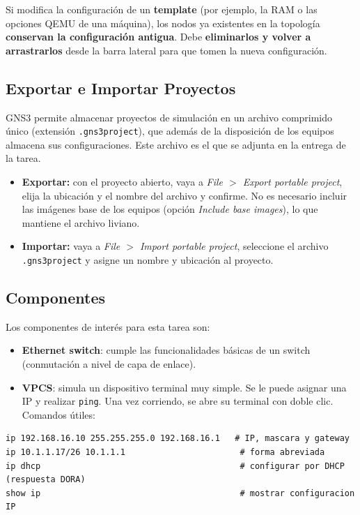\documentclass[letterpaper,12pt]{article}
\begin{document}
\begin{nota}
Si modifica la configuración de un \textbf{template} (por ejemplo, la RAM o las opciones QEMU de una máquina), los nodos ya existentes en la topología \textbf{conservan la configuración antigua}. Debe \textbf{eliminarlos y volver a arrastrarlos} desde la barra lateral para que tomen la nueva configuración.
\end{nota}

\subsection{Exportar e Importar Proyectos}

GNS3 permite almacenar proyectos de simulación en un archivo comprimido único (extensión \texttt{.gns3project}), que además de la disposición de los equipos almacena sus configuraciones. Este archivo es el que se adjunta en la entrega de la tarea.

\begin{itemize}
    \item \textbf{Exportar:} con el proyecto abierto, vaya a \textit{File $>$ Export portable project}, elija la ubicación y el nombre del archivo y confirme. No es necesario incluir las imágenes base de los equipos (opción \textit{Include base images}), lo que mantiene el archivo liviano.
    \item \textbf{Importar:} vaya a \textit{File $>$ Import portable project}, seleccione el archivo \texttt{.gns3project} y asigne un nombre y ubicación al proyecto.
\end{itemize}

\subsection{Componentes}

Los componentes de interés para esta tarea son:

\begin{itemize}
    \item \textbf{Ethernet switch}: cumple las funcionalidades básicas de un switch (conmutación a nivel de capa de enlace).
    \item \textbf{VPCS}: simula un dispositivo terminal muy simple. Se le puede asignar una IP y realizar \texttt{ping}. Una vez corriendo, se abre su terminal con doble clic. Comandos útiles:
\end{itemize}

\begin{lstlisting}
ip 192.168.16.10 255.255.255.0 192.168.16.1   # IP, mascara y gateway
ip 10.1.1.17/26 10.1.1.1                       # forma abreviada
ip dhcp                                        # configurar por DHCP (respuesta DORA)
show ip                                        # mostrar configuracion IP
\end{lstlisting}
\end{document}
